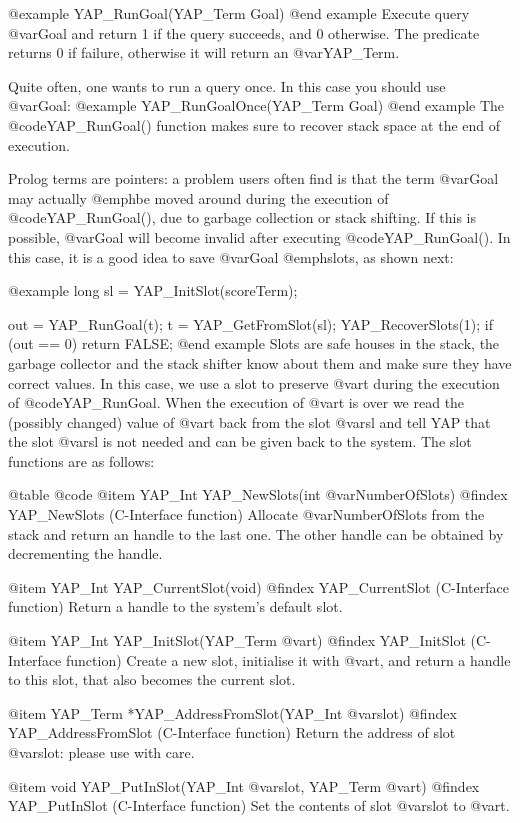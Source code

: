 {{{{{{{{{@example
  YAP_RunGoal(YAP_Term Goal)
@end example
Execute query @var{Goal} and return 1 if the query succeeds, and 0
otherwise. The predicate returns 0 if failure, otherwise it will return
an @var{YAP_Term}. 

Quite often, one wants to run a query once. In this case you should use
@var{Goal}:
@example
  YAP_RunGoalOnce(YAP_Term Goal)
@end example
The  @code{YAP_RunGoal()} function makes sure to recover stack space at
the end of execution.

Prolog terms are pointers: a problem users often find is that the term
@var{Goal} may actually @emph{be moved around} during the execution of
@code{YAP_RunGoal()}, due to garbage collection or stack shifting. If
this is possible, @var{Goal} will become invalid after executing
@code{YAP_RunGoal()}. In this case, it is a good idea to save @var{Goal}
@emph{slots}, as shown next:

@example
  long sl = YAP_InitSlot(scoreTerm);

  out = YAP_RunGoal(t);
  t = YAP_GetFromSlot(sl);
  YAP_RecoverSlots(1);
  if (out == 0) return FALSE;
@end example
Slots are safe houses in the stack, the garbage collector and the stack
shifter know about them and make sure they have correct values. In this
case, we use a slot to preserve @var{t} during the execution of
@code{YAP_RunGoal}. When the execution of @var{t} is over we read the
(possibly changed) value of @var{t} back from the slot @var{sl} and tell
YAP that the slot @var{sl} is not needed and can be given back to the
system. The slot functions are as follows:

@table @code
@item YAP_Int YAP_NewSlots(int @var{NumberOfSlots})
@findex YAP_NewSlots (C-Interface function)
Allocate @var{NumberOfSlots} from the stack and return an handle to the
last one. The other handle can be obtained by decrementing the handle.

@item YAP_Int YAP_CurrentSlot(void)
@findex YAP_CurrentSlot (C-Interface function)
Return a handle to the system's default slot.

@item YAP_Int YAP_InitSlot(YAP_Term @var{t})
@findex YAP_InitSlot (C-Interface function)
Create a new slot, initialise it with @var{t}, and return a handle to
this slot, that also becomes the current slot.

@item YAP_Term *YAP_AddressFromSlot(YAP_Int @var{slot})
@findex YAP_AddressFromSlot (C-Interface function)
Return the address of slot @var{slot}: please use with care.

@item void YAP_PutInSlot(YAP_Int @var{slot}, YAP_Term @var{t})
@findex YAP_PutInSlot (C-Interface function)
Set the contents of slot @var{slot} to @var{t}.

}}}}}}}}}
